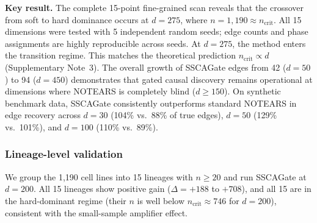 \documentclass[12pt,a4paper]{article}
\begin{document}
\textbf{Key result.} The complete 15-point fine-grained scan reveals that
the crossover from soft to hard dominance occurs at $d = 275$, where
$n = 1{,}190 \approx n_{\text{crit}}$. All 15 dimensions were tested with 5 independent
random seeds; edge counts and phase assignments are highly reproducible across
seeds. At $d = 275$, the method enters the transition regime.
This matches the theoretical prediction $n_{\text{crit}} \propto d$
(Supplementary Note~3). The overall growth of SSCAGate edges from 42 ($d = 50$) to
94 ($d = 450$) demonstrates that gated causal discovery remains
operational at dimensions where NOTEARS is completely blind
($d \geq 150$). On synthetic benchmark data, SSCAGate consistently
outperforms standard NOTEARS in edge recovery across $d = 30$ (104\% vs.\ 88\%
of true edges), $d = 50$ (129\% vs.\ 101\%), and $d = 100$ (110\% vs.\ 89\%).

\subsubsection*{Lineage-level validation}

We group the 1,190 cell lines into 15 lineages with $n \geq 20$ and
run SSCAGate at $d = 200$. All 15 lineages show positive gain
($\Delta = +188$ to $+708$), and all 15 are in the hard-dominant
regime (their $n$ is well below $n_{\text{crit}} \approx 746$ for
$d = 200$), consistent with the small-sample amplifier effect.
\end{document}

